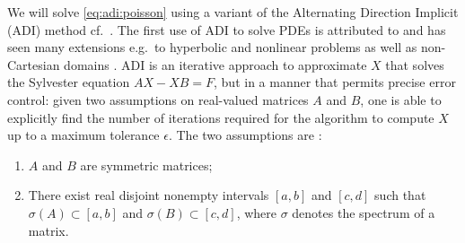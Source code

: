 \documentclass[hidelinks,onefignum,onetabnum]{siamart220329}
\begin{document}
We will solve \eqref{eq:adi:poisson} using a variant of the Alternating Direction Implicit (ADI) method  cf.~\cite{peaceman1955,fortunato2020fast,douglas1963,douglas1962,douglas1964,bruno2010}. The first use of ADI to solve PDEs is attributed to \cite{peaceman1955} and has seen many extensions e.g.~to hyperbolic and nonlinear problems as well as non-Cartesian domains \cite{bruno2010}.  ADI is an iterative approach to approximate $X$ that solves the Sylvester equation $AX - XB = F$, but in a manner that permits  precise error control: given two assumptions on real-valued matrices $A$ and $B$, one is able to explicitly find the number of iterations required for the algorithm to compute $X$ up to a maximum tolerance $\epsilon$. The two assumptions are \cite{fortunato2020fast}:
\begin{enumerate}[label={P}\arabic*.]
\itemsep=0pt
\item $A$ and $B$ are symmetric matrices; \label{as:P1}
\item There exist real disjoint nonempty intervals $[a, b]$ and $[c, d]$ such that $\sigma(A) \subset [a, b]$ and $\sigma(B) \subset [c, d]$, where $\sigma$ denotes the
spectrum of a matrix. \label{as:P2}
\end{enumerate}
\end{document}

